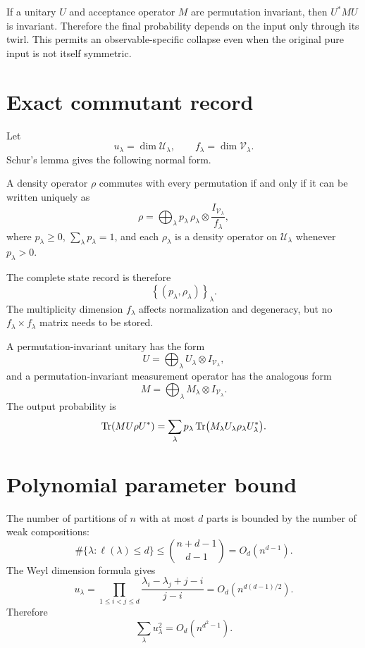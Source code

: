 If a unitary $U$ and acceptance operator $M$ are permutation invariant, then $U^*MU$ is invariant. Therefore the final probability depends on the input only through its twirl. This permits an observable-specific collapse even when the original pure input is not itself symmetric.

\section{Exact commutant record}
Let
\[
u_\lambda=\dim\mathcal U_\lambda,
\qquad
f_\lambda=\dim\mathcal V_\lambda.
\]
Schur's lemma gives the following normal form.

\begin{lemma}
\label{lem:invariant-state-normal-form}
A density operator $\rho$ commutes with every permutation if and only if it can be written uniquely as
\begin{equation}
\rho
=
\bigoplus_\lambda
p_\lambda\,\rho_\lambda\otimes
\frac{I_{\mathcal V_\lambda}}{f_\lambda},
\label{eq:commutant-state-record}
\end{equation}
where $p_\lambda\ge0$, $\sum_\lambda p_\lambda=1$, and each $\rho_\lambda$ is a density operator on $\mathcal U_\lambda$ whenever $p_\lambda>0$.
\end{lemma}

The complete state record is therefore
\[
\left\{
(p_\lambda,\rho_\lambda)
\right\}_\lambda.
\]
The multiplicity dimension $f_\lambda$ affects normalization and degeneracy, but no $f_\lambda\times f_\lambda$ matrix needs to be stored.

A permutation-invariant unitary has the form
\begin{equation}
U
=
\bigoplus_\lambda
U_\lambda\otimes I_{\mathcal V_\lambda},
\label{eq:commutant-unitary-form}
\end{equation}
and a permutation-invariant measurement operator has the analogous form
\[
M
=
\bigoplus_\lambda
M_\lambda\otimes I_{\mathcal V_\lambda}.
\]
The output probability is
\begin{equation}
\operatorname{Tr}(MU\rho U^*)
=
\sum_\lambda
p_\lambda
\operatorname{Tr}\bigl(M_\lambda U_\lambda\rho_\lambda U_\lambda^*\bigr).
\label{eq:commutant-output}
\end{equation}

\section{Polynomial parameter bound}
The number of partitions of $n$ with at most $d$ parts is bounded by the number of weak compositions:
\[
\#\{\lambda:\ell(\lambda)\le d\}
\le
\binom{n+d-1}{d-1}
=O_d(n^{d-1}).
\]
The Weyl dimension formula gives
\begin{equation}
u_\lambda
=
\prod_{1\le i<j\le d}
\frac{\lambda_i-\lambda_j+j-i}{j-i}
=O_d\left(n^{d(d-1)/2}\right).
\label{eq:weyl-dimension-bound}
\end{equation}
Therefore
\begin{equation}
\sum_\lambda u_\lambda^2
=O_d\left(n^{d^2-1}\right).
\label{eq:commutant-parameter-bound}
\end{equation}

